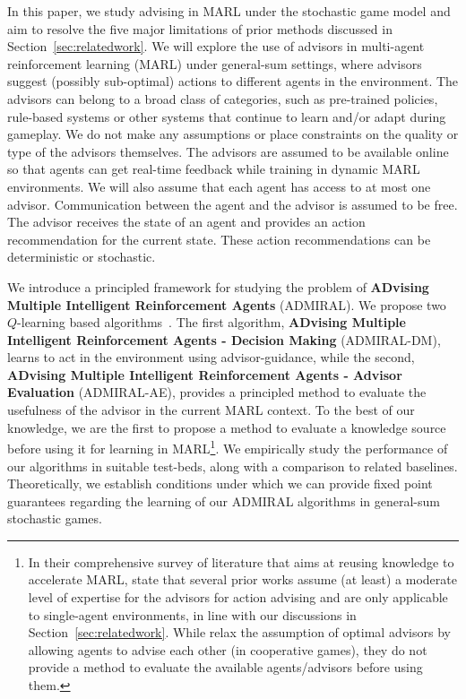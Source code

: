 \documentclass[jair, twoside,11pt,theapa]{article}
\begin{document}
In this paper, we study advising in MARL under the stochastic game model \citep{shapley1953stochastic} and aim to resolve the five major limitations of prior methods discussed in Section~\ref{sec:relatedwork}. We will explore the use of advisors in multi-agent reinforcement learning (MARL) under general-sum settings, where advisors suggest (possibly sub-optimal) actions to different agents in the environment. The advisors can belong to a broad class of categories, such as pre-trained policies, rule-based systems or other systems that continue to learn and/or adapt during gameplay. 
We do not make any assumptions or place constraints on the quality or type of the advisors themselves. The advisors are assumed to be available online so that agents can get real-time feedback while training in dynamic MARL environments. We will also assume that each agent  has access to at most one advisor.  Communication between the agent and the advisor is assumed to be free. The advisor receives the state of an agent and provides an action recommendation for the current state. These action recommendations can be deterministic or stochastic. 

We introduce a principled framework for studying the problem of \textbf{ADvising Multiple Intelligent Reinforcement Agents} (ADMIRAL). We propose two $Q$-learning based algorithms~\citep{watkins1992q}. 
The first algorithm, \textbf{ADvising Multiple Intelligent Reinforcement Agents - Decision Making} (ADMIRAL-DM), learns to act in the environment using advisor-guidance, while the second,  \textbf{ADvising Multiple Intelligent Reinforcement Agents - Advisor Evaluation} (ADMIRAL-AE),
provides a principled method to evaluate the usefulness of the advisor in the current MARL context. To the best of our knowledge, we are the first to propose a method to evaluate a knowledge source before using it for learning in MARL\footnote{In their comprehensive survey of literature that aims at reusing knowledge to accelerate MARL, \citet{da2019survey} state that several prior works \citep{Amir2016Interactive, Zhan2016Thoeretical} assume (at least) a moderate level of expertise for the advisors for action advising and are only applicable to single-agent environments, in line with our discussions in Section~\ref{sec:relatedwork}. While \citet{leno2017simultaneously} relax the assumption of optimal advisors by allowing agents to advise each other (in cooperative games), they do not provide a method to evaluate the available agents/advisors before using them.}. We  empirically study the performance of our algorithms in suitable test-beds, along with a comparison to related baselines. Theoretically, we  establish conditions under which we can provide fixed point guarantees regarding the learning of our ADMIRAL algorithms in general-sum stochastic games. 
\end{document}
